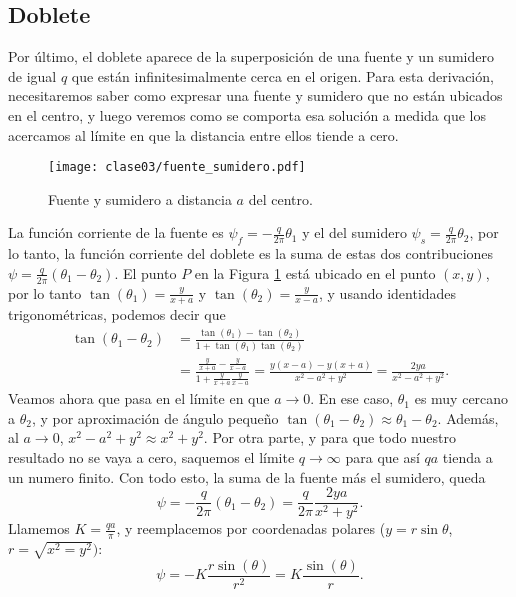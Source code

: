 \subsection*{Doblete}
Por último, el doblete aparece de la superposición de una fuente y un sumidero de igual $q$ que están infinitesimalmente cerca en el origen.
Para esta derivación, necesitaremos saber como expresar una fuente y sumidero que no están ubicados en el centro, y luego veremos como se comporta esa solución a medida que los acercamos al límite en que la distancia entre ellos tiende a cero.
%
\begin{figure}[!h]
\centering
\texttt{[image: clase03/fuente\_sumidero.pdf]}
\caption{Fuente y sumidero a distancia $a$ del centro.}
\label{fig:fuente_sumidero}
\end{figure}

La función corriente de la fuente es $\psi_f=-\frac{q}{2\pi}\theta_1$ y el del sumidero $\psi_s=\frac{q}{2\pi}\theta_2$, por lo tanto, la función corriente del doblete es la suma de estas dos contribuciones $\psi=\frac{q}{2\pi}(\theta_1-\theta_2)$.
El punto $P$ en la Figura \ref{fig:fuente_sumidero} está ubicado en el punto $(x,y)$, por lo tanto $\tan(\theta_1)=\frac{y}{x+a}$ y $\tan(\theta_2)=\frac{y}{x-a}$, y usando identidades trigonométricas, podemos decir que
%
\begin{align}
\tan(\theta_1-\theta_2) &= \frac{\tan(\theta_1)-\tan(\theta_2)}{1+\tan(\theta_1)\tan(\theta_2)}\nonumber\\
&=\frac{\frac{y}{x+a}-\frac{y}{x-a}}{1+\frac{y}{x+a}\frac{y}{x-a}} = \frac{y(x-a)-y(x+a)}{x^2-a^2+y^2} = \frac{2ya}{x^2-a^2+y^2}.
\end{align}
%
Veamos ahora que pasa en el límite en que $a\to0$.
En ese caso, $\theta_1$ es muy cercano a $\theta_2$, y por aproximación de ángulo pequeño $\tan(\theta_1-\theta_2)\approx\theta_1-\theta_2$.
Además, al $a\to0$, $x^2-a^2+y^2\approx x^2+y^2$.
Por otra parte, y para que todo nuestro resultado no se vaya a cero, saquemos el límite $q\to\infty$ para que así $qa$ tienda a un numero finito.
Con todo esto, la suma de la fuente más el sumidero, queda
%
\begin{equation}
\psi=-\frac{q}{2\pi}(\theta_1-\theta_2) = \frac{q}{2\pi}\frac{2ya}{x^2+y^2}.
\end{equation}
%
Llamemos $K=\frac{qa}{\pi}$, y reemplacemos por coordenadas polares ($y=r\sin\theta$, $r=\sqrt{x^2=y^2})$:
%
\begin{equation}
\psi = -K\frac{r\sin(\theta)}{r^2}=K\frac{\sin(\theta)}{r}.
\end{equation}

